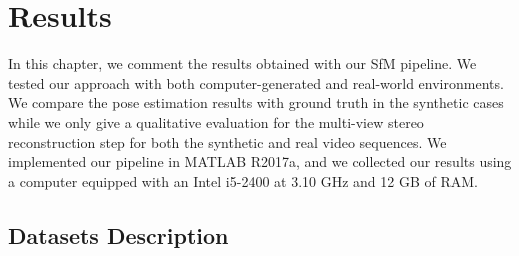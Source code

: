 \chapter{Results}\label{ch:results}
In this chapter, we comment the results obtained with our SfM pipeline.
We tested our approach with both computer-generated and real-world environments.
We compare the pose estimation results with ground truth in the synthetic cases
while we only give a qualitative evaluation for the multi-view stereo
reconstruction step for both the synthetic and real video sequences.
We implemented our pipeline in MATLAB R2017a, and we collected our results using
a computer equipped with an Intel i5-2400 at 3.10 GHz and 12 GB of RAM.

\section{Datasets Description}
